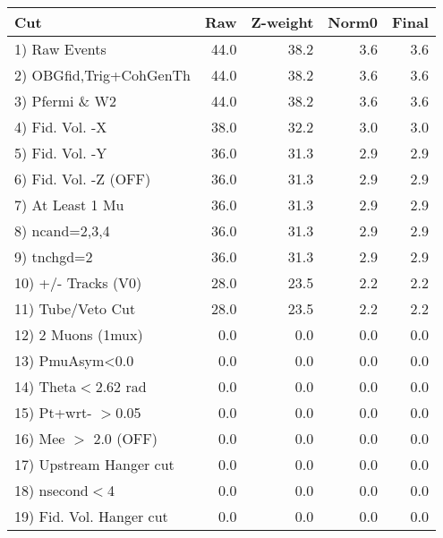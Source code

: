  \begin{table}[h!]\centering
 \begin{tabular}{||l||r|r|r|r||}
 \hline
 \hline
 Cut & Raw & Z-weight & Norm0 & Final \\
 \hline
  1) Raw Events           &        44.0 &        38.2 &         3.6 &         3.6 \\
  2) OBGfid,Trig+CohGenTh &        44.0 &        38.2 &         3.6 &         3.6 \\
  3) Pfermi \& W2         &        44.0 &        38.2 &         3.6 &         3.6 \\
  4) Fid. Vol. -X         &        38.0 &        32.2 &         3.0 &         3.0 \\
  5) Fid. Vol. -Y         &        36.0 &        31.3 &         2.9 &         2.9 \\
  6) Fid. Vol. -Z (OFF)   &        36.0 &        31.3 &         2.9 &         2.9 \\
  7) At Least 1 Mu        &        36.0 &        31.3 &         2.9 &         2.9 \\
  8) ncand=2,3,4          &        36.0 &        31.3 &         2.9 &         2.9 \\
  9) tnchgd=2             &        36.0 &        31.3 &         2.9 &         2.9 \\
 10) +/- Tracks (V0)      &        28.0 &        23.5 &         2.2 &         2.2 \\
 11) Tube/Veto Cut        &        28.0 &        23.5 &         2.2 &         2.2 \\
 12) 2 Muons (1mux)       &         0.0 &         0.0 &         0.0 &         0.0 \\
 13) PmuAsym<0.0          &         0.0 &         0.0 &         0.0 &         0.0 \\
 14) Theta$<$2.62 rad     &         0.0 &         0.0 &         0.0 &         0.0 \\
 15) Pt+wrt- $>$0.05      &         0.0 &         0.0 &         0.0 &         0.0 \\
 16) Mee $>$ 2.0  (OFF)   &         0.0 &         0.0 &         0.0 &         0.0 \\
 17) Upstream Hanger cut  &         0.0 &         0.0 &         0.0 &         0.0 \\
 18) nsecond$<$4          &         0.0 &         0.0 &         0.0 &         0.0 \\
 19) Fid. Vol. Hanger cut &         0.0 &         0.0 &         0.0 &         0.0 \\

\end{tabular}
\end{table}
